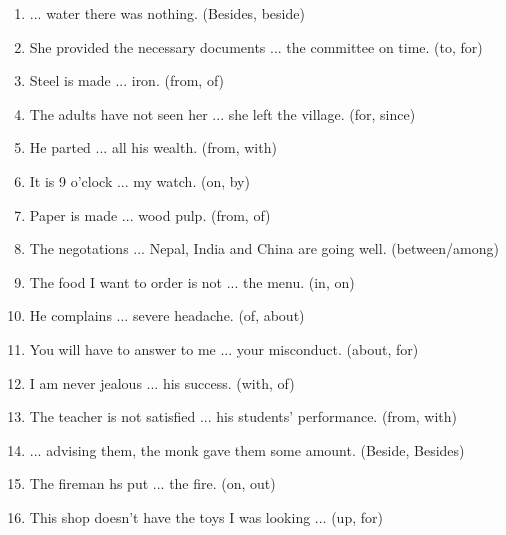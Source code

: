 \documentclass[12pt]{article}
\begin{document}
\begin{enumerate}
  \subsection{Prepositions}
    \item ... water there was nothing. \hfill (Besides, beside)

    \item She provided the necessary documents ... the committee on time. \hfill (to, for)

    \item Steel is made ... iron. \hfill (from, of)

    \item The adults have not seen her ... she left the village. \hfill (for, since)

    \item He parted ... all his wealth. \hfill (from, with)

    \item It is 9 o'clock ... my watch. \hfill (on, by)

    \item Paper is made ... wood pulp. \hfill (from, of)

    \item The negotations ... Nepal, India and China are going well. \hfill (between/among)

    \item The food I want to order is not ... the menu. \hfill (in, on)

    \item He complains ... severe headache. \hfill (of, about)

    \item You will have to answer to me ... your misconduct. \hfill (about, for)

    \item I am never jealous ... his success. \hfill (with, of)

    \item The teacher is not satisfied ... his students' performance. \hfill (from, with)

    \item ... advising them, the monk gave them some amount. \hfill (Beside, Besides)

    \item The fireman hs put ... the fire. \hfill (on, out)

    \item This shop doesn't have the toys I was looking ... \hfill (up, for)


\end{enumerate}
\end{document}
